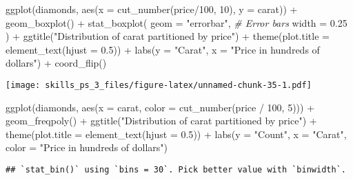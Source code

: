 \documentclass[
]{article}
\newenvironment{Shaded}{\begin{snugshade}}{\end{snugshade}}
\newcommand{\AttributeTok}[1]{\textcolor[rgb]{0.77,0.63,0.00}{#1}}
\newcommand{\CommentTok}[1]{\textcolor[rgb]{0.56,0.35,0.01}{\textit{#1}}}
\newcommand{\DecValTok}[1]{\textcolor[rgb]{0.00,0.00,0.81}{#1}}
\newcommand{\FloatTok}[1]{\textcolor[rgb]{0.00,0.00,0.81}{#1}}
\newcommand{\FunctionTok}[1]{\textcolor[rgb]{0.00,0.00,0.00}{#1}}
\newcommand{\NormalTok}[1]{#1}
\newcommand{\SpecialCharTok}[1]{\textcolor[rgb]{0.00,0.00,0.00}{#1}}
\newcommand{\StringTok}[1]{\textcolor[rgb]{0.31,0.60,0.02}{#1}}
\begin{document}
\begin{Shaded}
\begin{Highlighting}[]
\FunctionTok{ggplot}\NormalTok{(diamonds, }\FunctionTok{aes}\NormalTok{(}\AttributeTok{x =} \FunctionTok{cut\_number}\NormalTok{(price}\SpecialCharTok{/}\DecValTok{100}\NormalTok{, }\DecValTok{10}\NormalTok{), }\AttributeTok{y =}\NormalTok{ carat)) }\SpecialCharTok{+} 
  \FunctionTok{geom\_boxplot}\NormalTok{() }\SpecialCharTok{+}
  \FunctionTok{stat\_boxplot}\NormalTok{(}
    \AttributeTok{geom =} \StringTok{"errorbar"}\NormalTok{, }\CommentTok{\# Error bars}
    \AttributeTok{width =} \FloatTok{0.25}
\NormalTok{  )  }\SpecialCharTok{+}
  \FunctionTok{ggtitle}\NormalTok{(}\StringTok{"Distribution of carat partitioned by price"}\NormalTok{) }\SpecialCharTok{+}
  \FunctionTok{theme}\NormalTok{(}\AttributeTok{plot.title =} \FunctionTok{element\_text}\NormalTok{(}\AttributeTok{hjust =} \FloatTok{0.5}\NormalTok{)) }\SpecialCharTok{+}
  \FunctionTok{labs}\NormalTok{(}\AttributeTok{y =} \StringTok{"Carat"}\NormalTok{, }\AttributeTok{x =} \StringTok{"Price in hundreds of dollars"}\NormalTok{) }\SpecialCharTok{+}
  \FunctionTok{coord\_flip}\NormalTok{()}
\end{Highlighting}
\end{Shaded}

\texttt{[image: skills\_ps\_3\_files/figure-latex/unnamed-chunk-35-1.pdf]}

\begin{Shaded}
\begin{Highlighting}[]
\FunctionTok{ggplot}\NormalTok{(diamonds, }\FunctionTok{aes}\NormalTok{(}\AttributeTok{x =}\NormalTok{ carat, }\AttributeTok{color =} \FunctionTok{cut\_number}\NormalTok{(price }\SpecialCharTok{/} \DecValTok{100}\NormalTok{, }\DecValTok{5}\NormalTok{))) }\SpecialCharTok{+}
  \FunctionTok{geom\_freqpoly}\NormalTok{() }\SpecialCharTok{+}
  \FunctionTok{ggtitle}\NormalTok{(}\StringTok{"Distribution of carat partitioned by price"}\NormalTok{) }\SpecialCharTok{+}
  \FunctionTok{theme}\NormalTok{(}\AttributeTok{plot.title =} \FunctionTok{element\_text}\NormalTok{(}\AttributeTok{hjust =} \FloatTok{0.5}\NormalTok{)) }\SpecialCharTok{+}
  \FunctionTok{labs}\NormalTok{(}\AttributeTok{y =} \StringTok{"Count"}\NormalTok{, }\AttributeTok{x =} \StringTok{"Carat"}\NormalTok{, }\AttributeTok{color =} \StringTok{"Price in hundreds of dollars"}\NormalTok{)}
\end{Highlighting}
\end{Shaded}

\begin{verbatim}
## `stat_bin()` using `bins = 30`. Pick better value with `binwidth`.
\end{verbatim}
\end{document}
